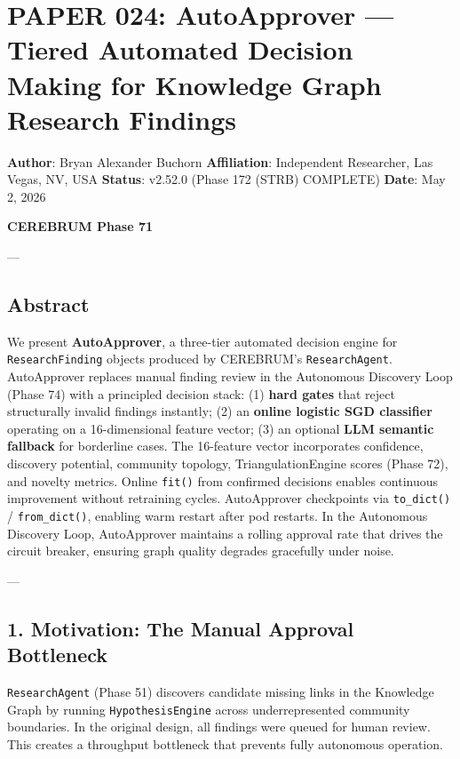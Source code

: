 \section{PAPER 024: AutoApprover — Tiered Automated Decision Making for Knowledge Graph Research Findings}

\textbf{Author}: Bryan Alexander Buchorn  
\textbf{Affiliation}: Independent Researcher, Las Vegas, NV, USA  
\textbf{Status}: v2.52.0 (Phase 172 (STRB) COMPLETE)
\textbf{Date}: May 2, 2026

\textbf{CEREBRUM Phase 71}

---

\subsection{Abstract}

We present \textbf{AutoApprover}, a three-tier automated decision engine for \texttt{ResearchFinding} objects produced by CEREBRUM's \texttt{ResearchAgent}. AutoApprover replaces manual finding review in the Autonomous Discovery Loop (Phase 74) with a principled decision stack: (1) \textbf{hard gates} that reject struc\-turally invalid findings instantly; (2) an \textbf{online logistic SGD classifier} operating on a 16-dimensional feature vector; (3) an optional \textbf{LLM semantic fallback} for borderline cases. The 16-feature vector incor\-porates confidence, discovery potential, community topology, Triang\-ulationEngine scores (Phase 72), and novelty metrics. Online \texttt{fit()} from confirmed decisions enables continuous improvement without retraining cycles. AutoApprover checkpoints via \texttt{to\_dict()} / \texttt{from\_dict()}, enabling warm restart after pod restarts. In the Autonomous Discovery Loop, AutoApprover maintains a rolling approval rate that drives the circuit breaker, ensuring graph quality degrades gracefully under noise.

---

\subsection{1. Motivation: The Manual Approval Bottleneck}

\texttt{ResearchAgent} (Phase 51) discovers candidate missing links in the Knowledge Graph by running \texttt{HypothesisEngine} across under\-represented community boundaries. In the original design, all findings were queued for human review. This creates a throughput bottleneck that prevents fully autonomous operation.

